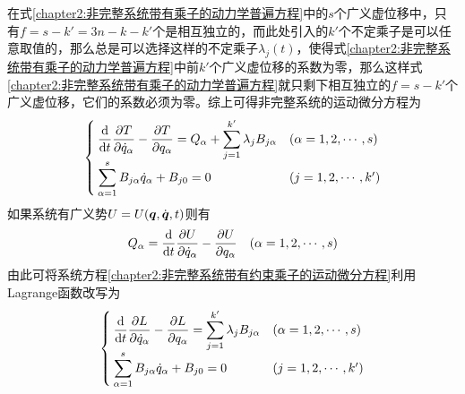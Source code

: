 在式\eqref{chapter2:非完整系统带有乘子的动力学普遍方程}中的$s$个广义虚位移中，只有$f=s-k'=3n-k-k'$个是相互独立的，而此处引入的$k'$个不定乘子是可以任意取值的，那么总是可以选择这样的不定乘子$\lambda_j(t)$，使得式\eqref{chapter2:非完整系统带有乘子的动力学普遍方程}中前$k'$个广义虚位移的系数为零，那么这样式\eqref{chapter2:非完整系统带有乘子的动力学普遍方程}就只剩下相互独立的$f=s-k'$个广义虚位移，它们的系数必须为零。综上可得非完整系统的运动微分方程为
\begin{equation}
\begin{cases}
	\displaystyle \dfrac{\mathrm{d}}{\mathrm{d} t} \frac{\partial T}{\partial \dot{q}_\alpha} - \frac{\partial T}{\partial q_\alpha} = Q_\alpha + \sum_{j=1}^{k'} \lambda_j B_{j\alpha}& (\alpha = 1,2,\cdots,s) \\[1.5ex]
	\displaystyle \sum_{\alpha=1}^s B_{j\alpha} \dot{q}_\alpha + B_{j0} = 0 & (j = 1,2,\cdots,k')
\end{cases}
\label{chapter2:非完整系统带有约束乘子的运动微分方程}
\end{equation}
如果系统有广义势$U=U(\boldsymbol{q},\dot{\boldsymbol{q}},t)$则有
\begin{equation}
	Q_\alpha = \dfrac{\mathrm{d}}{\mathrm{d} t}\frac{\partial U}{\partial \dot{q}_\alpha} - \frac{\partial U}{\partial q_\alpha}\quad (\alpha=1,2,\cdots,s)
\end{equation}
由此可将系统方程\eqref{chapter2:非完整系统带有约束乘子的运动微分方程}利用Lagrange函数改写为
\begin{equation}
\begin{cases}
	\displaystyle \frac{\mathrm{d}}{\mathrm{d} t} \frac{\partial L}{\partial \dot{q}_\alpha} - \frac{\partial L}{\partial q_\alpha} = \sum_{j=1}^{k'} \lambda_j B_{j\alpha} & (\alpha = 1,2,\cdots,s) \\[1.5ex]
	\displaystyle \sum_{\alpha=1}^s B_{j\alpha} \dot{q}_\alpha + B_{j0} = 0 & (j = 1,2,\cdots,k')
\end{cases}
\end{equation}

